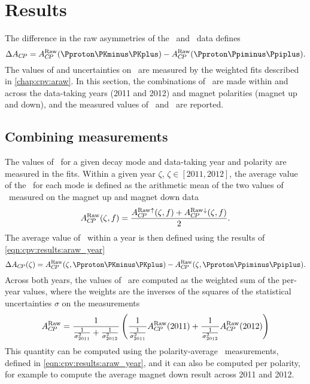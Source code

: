 \chapter{Results}
\label{chap:cpv:results}

The difference in the raw asymmetries of the \pKK\ and \ppipi\ data defines 
\dACP
\begin{equation*}
  \dACP = \ARaw(\pKK) - \ARaw(\ppipi).
\end{equation*}
The values of and uncertainties on \ARaw\ are measured by the weighted fits 
described in \cref{chap:cpv:araw}.
In this section, the combinations of \ARaw\ are made within and across the 
data-taking years (2011 and 2012) and magnet polarities (magnet up and down), 
and the measured values of \ARaw\ and \dACP\ are reported.

\section{Combining measurements}
\label{chap:cpv:results:combination}

The values of \ARaw\ for a given decay mode and data-taking year and polarity 
are measured in the fits.
Within a given year $\zeta$, $\zeta \in [2011, 2012]$, the average value of the 
\ARaw\ for each mode is defined as the arithmetic mean of the two values of 
\ARaw\ measured on the magnet up and magnet down data
\begin{equation}
  \ARaw(\zeta, f) = \frac{%
    \ARaw{}^{\uparrow}(\zeta, f) + \ARaw{}^{\downarrow}(\zeta, f)
  }{%
    2
  }.
  \label{eqn:cpv:results:araw_year}
\end{equation}
The average value of \dACP\ within a year is then defined using the results of 
\cref{eqn:cpv:results:araw_year}
\begin{equation}
  \dACP(\zeta) = \ARaw(\zeta, \pKK) - \ARaw(\zeta, \ppipi).
\end{equation}
Across both years, the values of \ARaw\ are computed as the weighted sum of the 
per-year values, where the weights are the inverses of the squares of the 
statistical uncertainties $\sigma$ on the measurements
\begin{equation}
  A_{C\!P}^{\textnormal{Raw}} =
    \frac{1}{\frac{1}{\sigma_{2011}^{2}} + \frac{1}{\sigma_{2012}^{2}}}
    \left(
      \frac{1}{\frac{1}{\sigma_{2011}^{2}}}A_{C\!P}^{\textnormal{Raw}}(2011) +
      \frac{1}{\frac{1}{\sigma_{2012}^{2}}}A_{C\!P}^{\textnormal{Raw}}(2012)
    \right)
  \label{eqn:cpv:results:araw_polarity}
\end{equation}
This quantity can be computed using the polarity-average \ARaw\ measurements, 
defined in \cref{eqn:cpv:results:araw_year}, and it can also be computed per 
polarity, for example to compute the average magnet down result across 2011 and 
2012.

